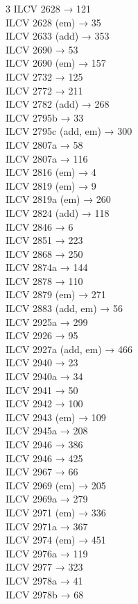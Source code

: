 \begin{multicols}{3}
ILCV 2628 → 121\\
ILCV 2628 (em) → 35\\
ILCV 2633 (add) → 353\\
ILCV 2690 → 53\\
ILCV 2690 (em) → 157\\
ILCV 2732 → 125\\
ILCV 2772 → 211\\
ILCV 2782 (add) → 268\\
ILCV 2795b → 33\\
ILCV 2795c (add, em) → 300\\
ILCV 2807a → 58\\
ILCV 2807a → 116\\
ILCV 2816 (em) → 4\\
ILCV 2819 (em) → 9\\
ILCV 2819a (em) → 260\\
ILCV 2824 (add) → 118\\
ILCV 2846 → 6\\
ILCV 2851 → 223\\
ILCV 2868 → 250\\
ILCV 2874a → 144\\
ILCV 2878 → 110\\
ILCV 2879 (em) → 271\\
ILCV 2883 (add, em) → 56\\
ILCV 2925a → 299\\
ILCV 2926 → 95\\
ILCV 2927a (add, em) → 466\\
ILCV 2940 → 23\\
ILCV 2940a → 34\\
ILCV 2941 → 50\\
ILCV 2942 → 100\\
ILCV 2943 (em) → 109\\
ILCV 2945a → 208\\
ILCV 2946 → 386\\
ILCV 2946 → 425\\
ILCV 2967 → 66\\
ILCV 2969 (em) → 205\\
ILCV 2969a → 279\\
ILCV 2971 (em) → 336\\
ILCV 2971a → 367\\
ILCV 2974 (em) → 451\\
ILCV 2976a → 119\\
ILCV 2977 → 323\\
ILCV 2978a → 41\\
ILCV 2978b → 68\\

\end{multicols}
